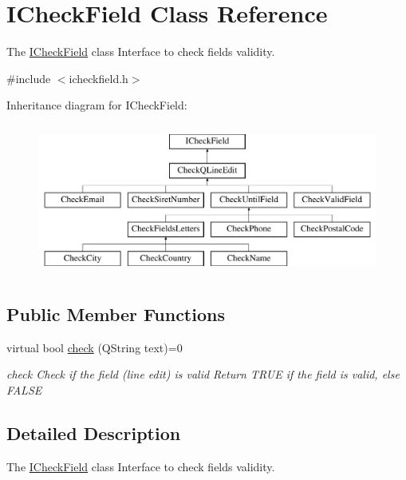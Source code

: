 \hypertarget{classICheckField}{\section{I\-Check\-Field Class Reference}
\label{classICheckField}
}


The \hyperlink{classICheckField}{I\-Check\-Field} class Interface to check fields validity.  




{\ttfamily \#include $<$icheckfield.\-h$>$}

Inheritance diagram for I\-Check\-Field\-:\begin{figure}[H]
\begin{center}
\leavevmode
\includegraphics[height=5.000000cm]{d5/d75/classICheckField}
\end{center}
\end{figure}
\subsection*{Public Member Functions}
\begin{DoxyCompactItemize}
\item 
virtual bool \hyperlink{classICheckField_a6bd42b4d49c165cdd92822135123fd4b}{check} (Q\-String text)=0
\begin{DoxyCompactList}\small\item\em check Check if the field (line edit) is valid Return T\-R\-U\-E if the field is valid, else F\-A\-L\-S\-E \end{DoxyCompactList}\end{DoxyCompactItemize}


\subsection{Detailed Description}
The \hyperlink{classICheckField}{I\-Check\-Field} class Interface to check fields validity. 

